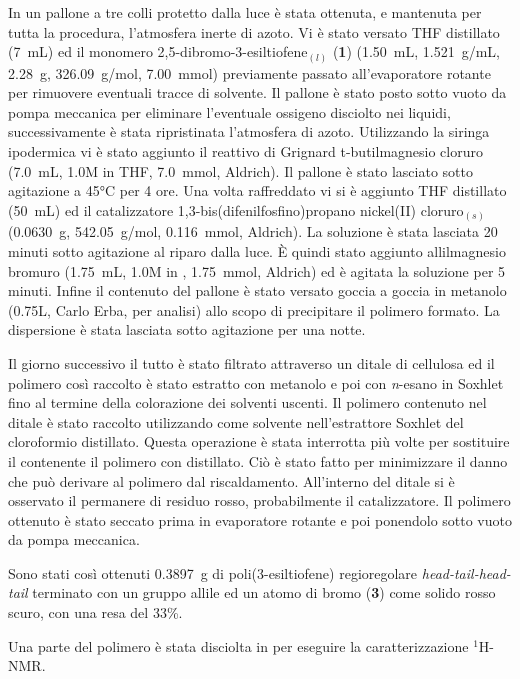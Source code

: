 In un pallone a tre colli protetto dalla luce è stata ottenuta, e mantenuta per tutta la procedura, l'atmosfera inerte di azoto. Vi è stato versato THF distillato (7~mL) ed il monomero 2,5-dibromo-3-esiltiofene$_{(l)}$ ({\bf{1}}) (1.50~mL, 1.521~g/mL, 2.28~g, 326.09~g/mol, 7.00~mmol) previamente passato all'evaporatore rotante per rimuovere eventuali tracce di solvente. Il pallone è stato posto sotto vuoto da pompa meccanica per eliminare l'eventuale ossigeno disciolto nei liquidi, successivamente è stata ripristinata l'atmosfera di azoto. Utilizzando la siringa ipodermica vi è stato aggiunto il reattivo di Grignard t-butilmagnesio cloruro (7.0~mL, 1.0M in THF, 7.0~mmol, Aldrich). Il pallone è stato lasciato sotto agitazione a 45°C per 4 ore. Una volta raffreddato vi si è aggiunto THF distillato (50~mL) ed il catalizzatore 1,3-bis(difenilfosfino)propano nickel(II) cloruro$_{(s)}$ (0.0630~g, 542.05~g/mol, 0.116~mmol, Aldrich). La soluzione è stata lasciata 20 minuti sotto agitazione al riparo dalla luce. È quindi stato aggiunto allilmagnesio bromuro (1.75~mL, 1.0M in , 
1.75~mmol, Aldrich) ed è agitata la soluzione per 5 minuti. Infine il contenuto del pallone è stato versato goccia a goccia in metanolo (0.75L, Carlo Erba, per analisi) allo scopo di precipitare il polimero formato. La dispersione è stata lasciata sotto agitazione per una notte. 

Il giorno successivo il tutto è stato filtrato attraverso un ditale di cellulosa ed il polimero così raccolto è stato estratto con metanolo e poi con {\itshape n}-esano in Soxhlet fino al termine della colorazione dei solventi uscenti. Il polimero contenuto nel ditale è stato raccolto utilizzando come solvente nell'estrattore Soxhlet del cloroformio distillato. Questa operazione è stata interrotta più volte per sostituire il  contenente il polimero con  distillato. Ciò è stato fatto per minimizzare il danno che può derivare al polimero dal riscaldamento. All'interno del ditale si è osservato il permanere di residuo rosso, probabilmente il catalizzatore. Il polimero ottenuto è stato seccato prima in evaporatore rotante e poi ponendolo sotto vuoto da pompa meccanica. 

Sono stati così ottenuti 0.3897~g di poli(3-esiltiofene) regioregolare \emph{head-tail-head-tail} terminato con un gruppo allile ed un atomo di bromo ({\bf 3}) come solido rosso scuro, con una resa del 33\%.

Una parte del polimero è stata disciolta in  per eseguire la caratterizzazione $^1$H-NMR.



